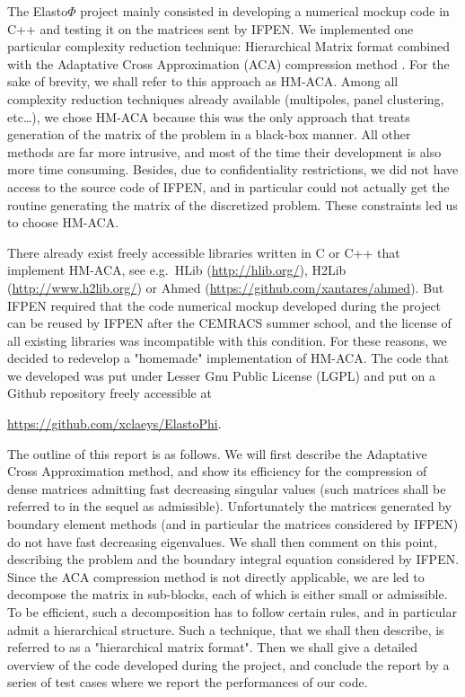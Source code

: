 \bigskip
The Elasto$\Phi$ project mainly consisted in developing a numerical mockup code in C++ and testing it on the matrices sent 
by IFPEN. We implemented one particular complexity reduction technique: Hierarchical Matrix \cite{Hackbusch2016} format combined with the Adaptative Cross 
Approximation (ACA) compression method \cite{Bebendorf2008}. For the sake of brevity, we shall refer to this approach as HM-ACA. 
Among all complexity reduction techniques 
already available (multipoles, panel clustering, etc\dots), we chose HM-ACA because this was the only approach that treats generation 
of the matrix of the problem in a black-box manner. All other methods are far more intrusive, and most of the time their development 
is also more time consuming. Besides, due to confidentiality restrictions, we did not have access to the source code of IFPEN, and 
in particular could not actually get the routine generating the matrix of the discretized problem. These constraints led us to choose HM-ACA.

\bigskip
There already exist freely accessible libraries written in C or C++ that implement HM-ACA, see e.g.~HLib (\url{http://hlib.org/}), H2Lib 
(\url{http://www.h2lib.org/}) or Ahmed (\url{https://github.com/xantares/ahmed}). But IFPEN required 
that the code numerical mockup developed during the project can be reused by IFPEN after the CEMRACS summer school, 
and the license of all existing libraries was incompatible with this condition. For these reasons, we decided to redevelop 
a "homemade" implementation of HM-ACA. The code that we developed was put under Lesser Gnu Public License (LGPL) and 
put on a Github repository freely accessible at
\begin{center}
\url{https://github.com/xclaeys/ElastoPhi}.
\end{center}

\medskip
The outline of this report is as follows. We will first describe the Adaptative Cross Approximation method, and show its efficiency 
for the compression of dense matrices admitting fast decreasing singular values (such matrices shall be referred to in the sequel as admissible). 
Unfortunately the matrices generated by boundary element  methods (and in particular the matrices considered by IFPEN) do not have 
fast decreasing eigenvalues. We shall then comment on this point, describing the problem and the boundary integral equation 
considered by IFPEN. Since the ACA compression method is not directly applicable, we are led to decompose the matrix in sub-blocks, 
each of which is either small or admissible. To be efficient, such a decomposition has to follow certain rules, and in particular 
admit a hierarchical structure. Such a technique, that we shall then describe, is referred to as a "hierarchical matrix format". 
Then we shall give a detailed overview of the code developed during the project, and conclude the report by a series of test 
cases where we report the performances of our code.


